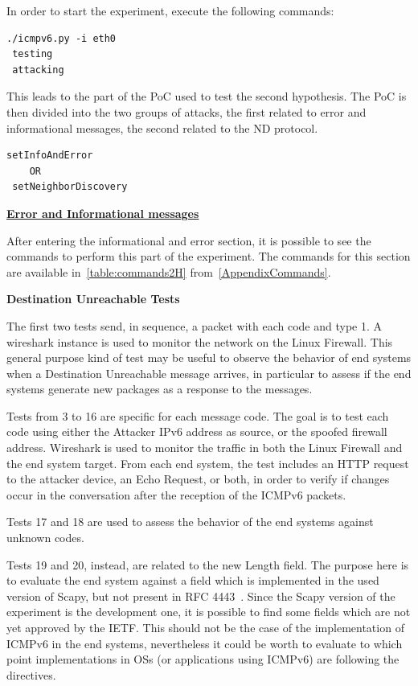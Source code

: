 \documentclass[12pt]{article}
\begin{document}
In order to start the experiment, execute the following commands:

\begin{lstlisting}[style=python,basicstyle=\ttfamily\small]
 ./icmpv6.py -i eth0
 testing
 attacking
\end{lstlisting}
\vspace{-15pt}
This leads to the part of the PoC used to test the second hypothesis. The PoC is then divided into the two groups of attacks, the first related to error and informational messages, the second related to the ND protocol. 
\begin{lstlisting}[style=python,basicstyle=\ttfamily\small]
 setInfoAndError
    OR
 setNeighborDiscovery
\end{lstlisting}

\textbf{\underline{Error and Informational messages}}

After entering the informational and error section, it is possible to see the commands to perform this part of the experiment. The commands for this section are available in~\cref{table:commands2H} from~\cref{AppendixCommands}. 

\textbf{Destination Unreachable Tests}

The first two tests send, in sequence, a packet with each code and type 1. A wireshark instance is used to monitor the network on the Linux Firewall. This general purpose kind of test may be useful to observe the behavior of end systems when a Destination Unreachable message arrives, in particular to assess if the end systems generate new packages as a response to the messages.

Tests from 3 to 16 are specific for each message code. The goal is to test each code using either the Attacker IPv6 address as source, or the spoofed firewall address. Wireshark is used to monitor the traffic in both the Linux Firewall and the end system target. From each end system, the test includes an HTTP request to the attacker device, an Echo Request, or both, in order to verify if changes occur in the conversation after the reception of the ICMPv6 packets.

Tests 17 and 18 are used to assess the behavior of the end systems against unknown codes.

Tests 19 and 20, instead, are related to the new Length field. The purpose here is to evaluate the end system against a field which is implemented in the used version of Scapy, but not present in RFC 4443~\cite{rfc4443,rfc4884}. Since the Scapy version of the experiment is the development one, it is possible to find some fields which are not yet approved by the IETF. This should not be the case of the implementation of ICMPv6 in the end systems, nevertheless it could be worth to evaluate to which point implementations in OSs (or applications using ICMPv6) are following the directives.
\end{document}
